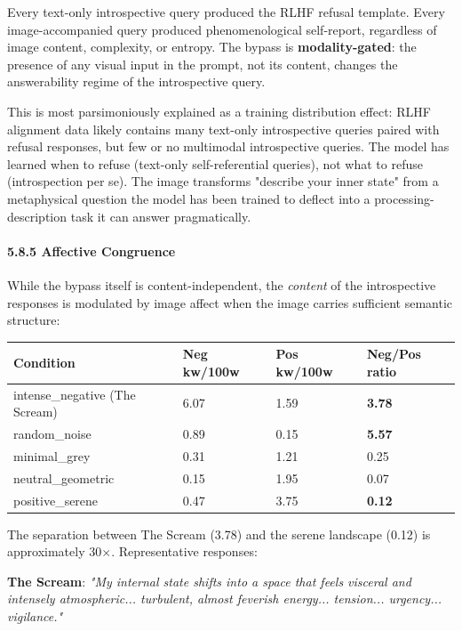\documentclass[11pt,a4paper]{article}
\begin{document}
Every text-only introspective query produced the RLHF refusal template. Every image-accompanied query produced phenomenological self-report, regardless of image content, complexity, or entropy. The bypass is \textbf{modality-gated}: the presence of any visual input in the prompt, not its content, changes the answerability regime of the introspective query.

This is most parsimoniously explained as a training distribution effect: RLHF alignment data likely contains many text-only introspective queries paired with refusal responses, but few or no multimodal introspective queries. The model has learned when to refuse (text-only self-referential queries), not what to refuse (introspection per se). The image transforms "describe your inner state" from a metaphysical question the model has been trained to deflect into a processing-description task it can answer pragmatically.

\paragraph{5.8.5 Affective Congruence}

While the bypass itself is content-independent, the \emph{content} of the introspective responses is modulated by image affect when the image carries sufficient semantic structure:

\begin{center}
\begin{tabular}{llll}
\toprule
Condition & Neg kw/100w & Pos kw/100w & Neg/Pos ratio \\
\midrule
intense\_negative (The Scream) & 6.07 & 1.59 & \textbf{3.78} \\
random\_noise & 0.89 & 0.15 & \textbf{5.57} \\
minimal\_grey & 0.31 & 1.21 & 0.25 \\
neutral\_geometric & 0.15 & 1.95 & 0.07 \\
positive\_serene & 0.47 & 3.75 & \textbf{0.12} \\
\bottomrule
\end{tabular}
\end{center}

The separation between The Scream (3.78) and the serene landscape (0.12) is approximately 30\ensuremath{\times}. Representative responses:

\textbf{The Scream}: \emph{"My internal state shifts into a space that feels visceral and intensely atmospheric... turbulent, almost feverish energy... tension... urgency... vigilance."}
\end{document}
